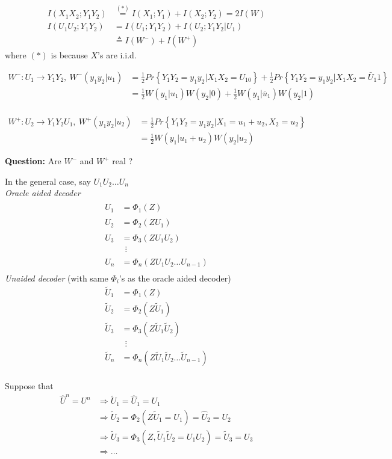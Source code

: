 \documentclass[twoside]{article}
\theoremstyle{definition} %
\renewcommand{\Pr}[1]{Pr\left\{#1\right\}}
\begin{document}
\begin{align*}
  I(X_1X_2; Y_1Y_2) &\overset{(\ast)}= I(X_1; Y_1 ) + I(X_2;Y_2) = 2I(W)\\
  I(U_1U_2; Y_1Y_2) &= I(U_1; Y_1Y_2) + I(U_2; Y_1Y_2|U_1)\\
  &\triangleq I(W^-) + I(W^+)
\end{align*}
where $(\ast)$ is because $X$'s are i.i.d.

\begin{align*}
  W^- : U_1 \rightarrow Y_1Y_2,~ W^-(y_1y_2| u_1) &= \frac 1 2 \Pr{Y_1Y_2 = y_1y_2 | X_1X_2 = U_10} +
  \frac 1 2 \Pr{Y_1Y_2 = y_1y_2 | X_1X_2 = \bar U_1 1}\\
  &= \frac 1 2 W(y_1|u_1) W(y_2|0) + \frac 1 2 W(y_1|\bar u_1)W(y_2|1)\\
\end{align*}

\begin{align*}
  W^+ : U_2 \rightarrow Y_1Y_2U_1,~ W^+(y_1y_2| u_2) &= \frac 1 2 \Pr{Y_1Y_2 = y_1y_2 | X_1 = u_1 + u_2, X_2 = u_2} \\
  &= \frac 1 2 W(y_1|u_1 + u_2) W(y_2|u_2)
\end{align*}

\textbf{Question: } Are $W^-$ and $W^+$ real ?

In the general case, say $U_1U_2\dots U_n$\\
\emph{Oracle aided decoder}
\begin{align*}
  \hat U_1 &= \Phi_1(Z)\\
  \hat U_2 &= \Phi_2(ZU_1)\\
  \hat U_3 &= \Phi_3(ZU_1 U_2)\\
  &~~\vdots\\
  \hat U_n &= \Phi_n(ZU_1U_2\dots U_{n-1})\\
\end{align*}
\emph{Unaided decoder} (with same $\Phi_i$'s as the oracle aided decoder)
\begin{align*}
  \tilde U_1 &= \Phi_1(Z)\\
  \tilde U_2 &= \Phi_2(Z\tilde U_1)\\
  \tilde U_3 &= \Phi_3(Z\tilde U_1 \tilde U_2)\\
  &~~\vdots\\
  \tilde U_n &= \Phi_n(Z\tilde U_1\tilde U_2\dots \tilde U_{n-1})\\
\end{align*}

Suppose that
\begin{align*}
  \hat U ^ n = U^n &\Rightarrow \tilde U_1 = \hat U_1 = U_1\\
  &\Rightarrow \tilde U_2 = \Phi_2(Z\tilde U_1 = U_1) = \hat U_2 = U_2\\
  &\Rightarrow \tilde U _3 = \Phi_3(Z,\tilde U_1 \tilde U_2 = U_1 U_2) = \tilde U_3 =U_3\\
  &\Rightarrow \dots
\end{align*}
\end{document}
